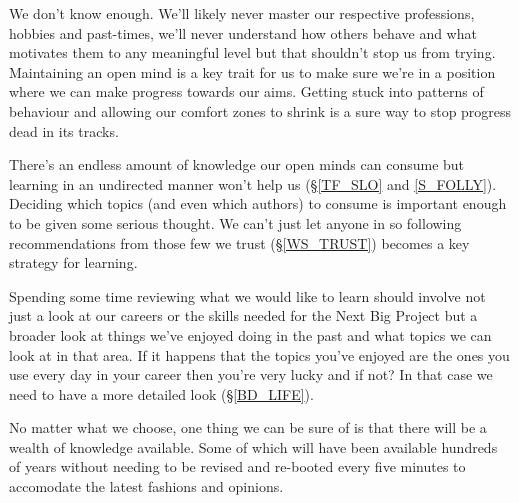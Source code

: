 \cleardoublepage
{\small

We don't know enough. We'll likely never master our respective professions, hobbies and past-times, we'll never understand how others behave and what motivates them to any meaningful level but that shouldn't stop us from trying. Maintaining an open mind is a key trait for us to make sure we're in a position where we can make progress towards our aims. Getting stuck into patterns of behaviour and allowing our comfort zones to shrink is a sure way to stop progress dead in its tracks.

There's an endless amount of knowledge our open minds can consume but learning in an undirected manner won't help us (\S  \ref{TF_SLO} and \ref{S_FOLLY}). 
Deciding which topics (and even which authors) to consume is important enough to be given some serious thought. We can't just let anyone in so following recommendations from those few we trust (\S \ref{WS_TRUST}) becomes a key strategy for learning.

Spending some time reviewing what we would like to learn should involve not just a look at our careers or the skills needed for the Next Big Project but a broader look at things we've enjoyed doing in the past and what topics we can look at in that area. If it happens that the topics you've enjoyed are the ones you use every day in your career then you're very lucky and if not? In that case we need to have a more detailed look (\S \ref{BD_LIFE}).

No matter what we choose, one thing we can be sure of is that there will be a wealth of knowledge available. Some of which will have been available hundreds of years without needing to be revised and re-booted every five minutes to accomodate the latest fashions and opinions.

}
